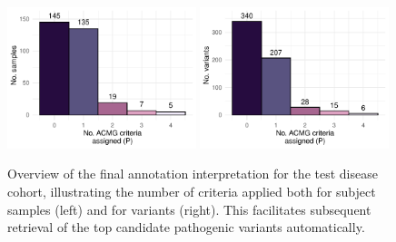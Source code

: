 \begin{figure}[!h]
\centering
\includegraphics[width=0.49\textwidth]{./images/Guru_singlecase_criteria_per_sample_small.pdf}
\includegraphics[width=0.49\textwidth]{./images/Guru_singlecase_variants_per_criteria_small.pdf}
\caption{Overview of the final annotation interpretation for the test disease cohort, illustrating the number of criteria applied both for subject samples (left) and for variants (right). This facilitates subsequent retrieval of the top candidate pathogenic variants automatically.}
\label{fig:guru_case_study_guruscores}
\end{figure}



